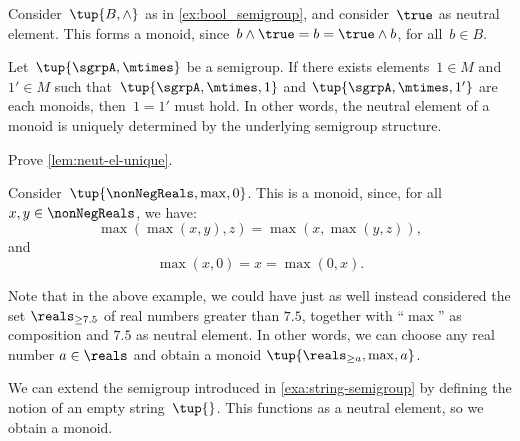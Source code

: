 \begin{example}
  \label{ex:bool_monoid}
  Consider~$\tup{B,\wedge}$ as in \cref{ex:bool_semigroup}, and consider~$\true$ as neutral element. This forms a monoid, since~$b\wedge \true=b=\true \wedge b$, for all~$b\in B$.
\end{example}

\begin{lemma}
  \label{lem:neut-el-unique}
  Let~$\tup{\sgrpA, \mtimes}$ be a semigroup. If there exists elements~$1 \in M$ and~$1' \in M$ such that~$\tup{\sgrpA, \mtimes, 1}$ and $\tup{\sgrpA, \mtimes, 1'}$ are each monoids, then~$1 = 1'$ must hold.
  In other words, the neutral element of a monoid is uniquely determined by the underlying semigroup structure.
\end{lemma}

\begin{gradedexercise}
  Prove \cref{lem:neut-el-unique}.
\end{gradedexercise}

\begin{example}
  Consider~$\tup{\nonNegReals,\max,0}$. This is a monoid, since, for all~$x,y\in \nonNegReals$, we have:
  \begin{equation*}
    \max(\max(x,y),z)=\max(x,\max(y,z)),
  \end{equation*}
  and
  \begin{equation*}
    \max(x,0)=x=\max(0,x).
  \end{equation*}
\end{example}

\begin{remark}
  Note that in the above example, we could have just as well instead considered the set $\reals_{\geq 7.5}$ of real numbers greater than $7.5$, together with ``$\max$'' as composition and $7.5$ as neutral element.
  In other words, we can choose any real number $a \in \reals$ and obtain a monoid $\tup{\reals_{\geq a},\max, a}$.
\end{remark}




\begin{example}
  \label{exa:string-monoid}
  We can extend the semigroup introduced in \cref{exa:string-semigroup} by defining the notion of an empty string~$\tup{}$.
  This functions as a neutral element, so we obtain a monoid.
\end{example}


